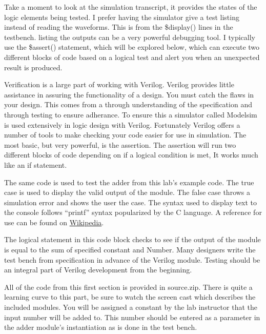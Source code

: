       Take a moment to look at the simulation transcript, it provides the states of the logic elements being tested.
      I prefer having the simulator give a test listing instead of reading the waveforms. This is from the \$display()
      lines in the testbench. listing the outputs can be a very powerful debugging tool. I typically use the \$assert()
      statement, which will be explored below, which can execute two different blocks of code based on a logical test and alert you when an unexpected result is produced.
      

      Verification is a large part of working with Verilog. Verilog provides little assistance in assuring the functionality of a design. You must catch the flaws in your design. This comes from a through understanding of the specification and through testing to ensure adherance. To ensure this a simulator called Modelsim is used extensively in logic design with Verilog. Fortunately Verilog offers a number of tools to make checking your code easier for use in simulation. The most basic, but very powerful, is the assertion. The assertion will run two different blocks of code depending on if a logical condition is met, It works much like an if statement.
      

      The same code is used to test the adder from this lab's example code. The true case is used to display the valid output of the module. The false case throws a simulation error and shows the user the case. The syntax used to display text to the console follows ``printf'' syntax popularized by the C language. A reference for use can be found on \href{https://en.wikipedia.org/wiki/Printf_format_string}{Wikipedia}.
      

      The logical statement in this code block checks to see if the output of the module is equal to the sum of specified constant and Number. Many designers write the test bench from specification in advance of the Verilog module. Testing should be an integral part of Verilog development from the beginning.

      All of the code from this first section is provided in source.zip. There is quite a learning curve to this part, be sure to watch the screen cast which describes the included modules. You will be assigned a constant by the lab instructor that the input number will be added to. This number should be entered as a parameter in the adder module's instantiation as is done in the test bench.

